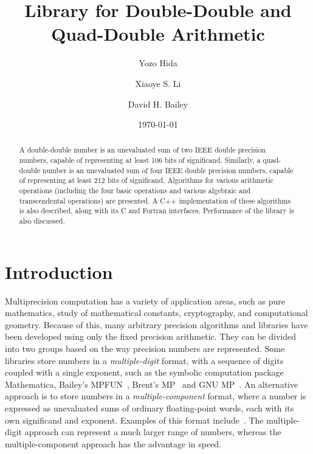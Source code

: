 \documentclass[11pt]{article}
\title{Library for Double-Double and Quad-Double Arithmetic\footnotemark[1]}
\author{Yozo Hida\footnotemark[2] \and Xiaoye S. Li\footnotemark[3]
  \and David H. Bailey\footnotemark[3]}
\date{\today}
\theoremstyle{definition}
\begin{document}
\maketitle

\renewcommand{\thefootnote}{\fnsymbol{footnote}}


\renewcommand{\thefootnote}{\arabic{footnote}}

\vspace{1cm}
\begin{abstract}
  A double-double number is an unevaluated sum of two IEEE double
  precision numbers, capable of representing at least 106 bits of
  significand.  Similarly, a quad-double number is an unevaluated sum
  of four IEEE double precision numbers, capable of representing at
  least 212 bits of significand.  Algorithms for various arithmetic
  operations (including the four basic operations and various
  algebraic and transcendental operations) are presented. A C++
  implementation of these algorithms is also described, along with its
  C and Fortran interfaces.  Performance of the library is also
  discussed.
\end{abstract}

\newpage
\tableofcontents
\newpage

\section{Introduction} \label{sec:intro}
Multiprecision computation has a variety of application areas, such as
pure mathematics, study of mathematical constants, cryptography,
and computational geometry. Because of this, many arbitrary precision 
algorithms and libraries have been developed using only the fixed
precision arithmetic. They can be divided into two groups based on
the way precision numbers are represented. Some libraries store numbers in a
{\em multiple-digit} format, with a sequence of digits coupled with a 
single exponent, such as the symbolic computation package
Mathematica, Bailey's MPFUN~\cite{bai-mp}, Brent's MP~\cite{brent} and
GNU MP~\cite{gnu-mp}.  An alternative approach is to store numbers
in a {\em multiple-component} format, where a number is expressed
as unevaluated sums of ordinary floating-point words, each with its own
significand and exponent.  Examples of this format 
include~\cite{dek71,pri92,she97}.  The multiple-digit approach can 
represent a much larger range of numbers, whereas the multiple-component 
approach has the advantage in speed.
\end{document}

